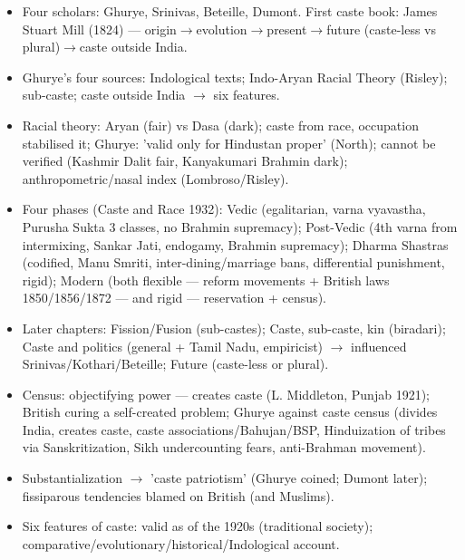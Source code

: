 \begin{QuickRevision}
\begin{itemize}
\item Four scholars: Ghurye, Srinivas, Beteille, Dumont. First caste book: James Stuart Mill (1824) --- origin$\rightarrow$evolution$\rightarrow$present$\rightarrow$future (caste-less vs plural)$\rightarrow$caste outside India.
\item Ghurye's four sources: Indological texts; Indo-Aryan Racial Theory (Risley); sub-caste; caste outside India $\rightarrow$ six features.
\item Racial theory: Aryan (fair) vs Dasa (dark); caste from race, occupation stabilised it; Ghurye: 'valid only for Hindustan proper' (North); cannot be verified (Kashmir Dalit fair, Kanyakumari Brahmin dark); anthropometric/nasal index (Lombroso/Risley).
\item Four phases (Caste and Race 1932): Vedic (egalitarian, varna vyavastha, Purusha Sukta 3 classes, no Brahmin supremacy); Post-Vedic (4th varna from intermixing, Sankar Jati, endogamy, Brahmin supremacy); Dharma Shastras (codified, Manu Smriti, inter-dining/marriage bans, differential punishment, rigid); Modern (both flexible --- reform movements + British laws 1850/1856/1872 --- and rigid --- reservation + census).
\item Later chapters: Fission/Fusion (sub-castes); Caste, sub-caste, kin (biradari); Caste and politics (general + Tamil Nadu, empiricist) $\rightarrow$ influenced Srinivas/Kothari/Beteille; Future (caste-less or plural).
\item Census: objectifying power --- creates caste (L. Middleton, Punjab 1921); British curing a self-created problem; Ghurye against caste census (divides India, creates caste, caste associations/Bahujan/BSP, Hinduization of tribes via Sanskritization, Sikh undercounting fears, anti-Brahman movement).
\item Substantialization $\rightarrow$ 'caste patriotism' (Ghurye coined; Dumont later); fissiparous tendencies blamed on British (and Muslims).
\item Six features of caste: valid as of the 1920s (traditional society); comparative/evolutionary/historical/Indological account.
\end{itemize}
\end{QuickRevision}

